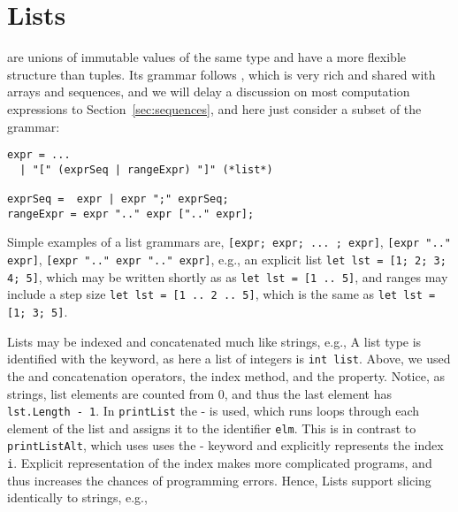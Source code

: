 \section{Lists}
 are unions of immutable values of the same type and have a more flexible structure than tuples. Its grammar follows , which is very rich and shared with arrays and sequences, and we will delay a discussion on most computation expressions to Section~\ref{sec:sequences}, and here just consider a subset of the grammar:
\begin{lstlisting}[language=ebnf]
expr = ... 
  | "[" (exprSeq | rangeExpr) "]" (*list*)

exprSeq =  expr | expr ";" exprSeq;
rangeExpr = expr ".." expr [".." expr];
\end{lstlisting}
Simple examples of a list grammars are, \lstinline[language=ebnf]![expr; expr; ... ; expr]!, \lstinline[language=ebnf]![expr ".." expr]!, \lstinline[language=ebnf]![expr ".." expr ".." expr]!, e.g., an explicit list \lstinline!let lst = [1; 2; 3; 4; 5]!, which may be written shortly as  as \lstinline!let lst = [1 .. 5]!, and ranges may include a step size \lstinline!let lst = [1 .. 2 .. 5]!, which is the same as \lstinline!let lst = [1; 3; 5]!.

Lists may be indexed and concatenated much like strings, e.g.,
%
%
A list type is identified with the  keyword, as here a list of integers is \lstinline!int list!. Above, we used the  and \idx{\lexeme{::}} concatenation operators, the  index method, and the  property. Notice, as strings, list elements are counted from 0, and thus the last element has \lstinline!lst.Length - 1!. In \lstinline!printList! the - is used, which runs loops through each element of the list and assigns it to the identifier \lstinline!elm!. This is in contrast to \lstinline!printListAlt!, which uses uses the - keyword and explicitly represents the index \lstinline!i!. Explicit representation of the index makes more complicated programs, and thus increases the chances of programming errors. Hence,  Lists support slicing identically to strings, e.g.,
%
%


